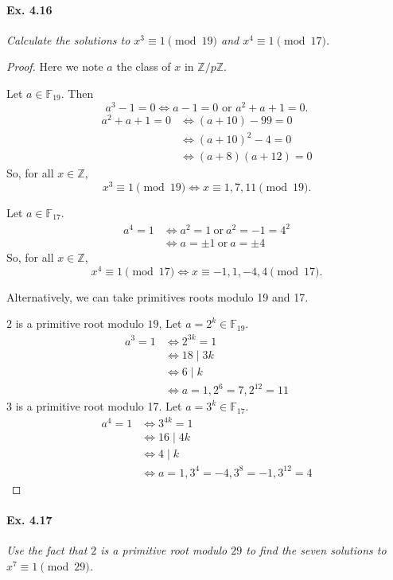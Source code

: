 \documentclass[11pt,a4paper]{article}
\newcommand{\Z}{\mathbb{Z}}
\newcommand{\F}{\mathbb{F}}
\begin{document}
\paragraph{Ex. 4.16}

{\it Calculate the solutions to $x^3 \equiv 1 \pmod {19}$ and $x^4 \equiv 1\pmod {17}$.
}

\begin{proof}
Here we note $a$ the class of $x$ in $\Z/p\Z$.

Let $a \in \F_{19}$. Then
$$a^3 - 1 = 0 \iff a-1 = 0 \text{ or }a^2+a+1=0.$$
\begin{align*}
a^2+a+1 = 0 &\iff (a + 10) - 99 = 0\\
&\iff (a+10)^2 - 4 = 0\\
&\iff (a+8)(a+12) = 0
\end{align*}
So, for all $x\in \Z$,
$$x^3 \equiv 1 \pmod {19} \iff x \equiv 1,7,11 \pmod {19}.$$

Let $a \in \F_{17}$.
\begin{align*}
a^4 = 1 &\iff a^2 = 1 \ \mathrm{or}\ a^2 = -1 = 4^2\\
&\iff a = \pm 1 \ \mathrm{or}\  a =\pm 4
\end{align*}
So, for all $x\in \Z$,
$$x^4 \equiv 1 \pmod {17} \iff x\equiv -1,1,-4,4 \pmod {17}.$$

Alternatively, we can take primitives roots modulo 19 and 17.

$2$ is a primitive root modulo $19$, Let $a = 2^k \in \F_{19}$.
\begin{align*}
a^3 = 1 &\iff 2^{3k} = 1\\
&\iff 18 \mid 3k\\
&\iff 6 \mid k\\
&\iff a = 1, 2^6 = 7, 2^{12} = 11
\end{align*}
$3$ is a primitive root modulo 17. Let $a = 3^k \in \F_{17}$.
\begin{align*}
a^4 = 1 &\iff 3^{4k} = 1\\
&\iff 16 \mid 4 k\\
&\iff 4 \mid k\\
&\iff a = 1, 3^4 = -4, 3^8 = -1, 3^{12} = 4
\end{align*}
\end{proof}

\paragraph{Ex. 4.17}

{\it 
Use the fact that $2$ is a primitive root modulo $29$ to find the seven solutions to $x^7 \equiv 1 \pmod {29}$.
}
\end{document}
